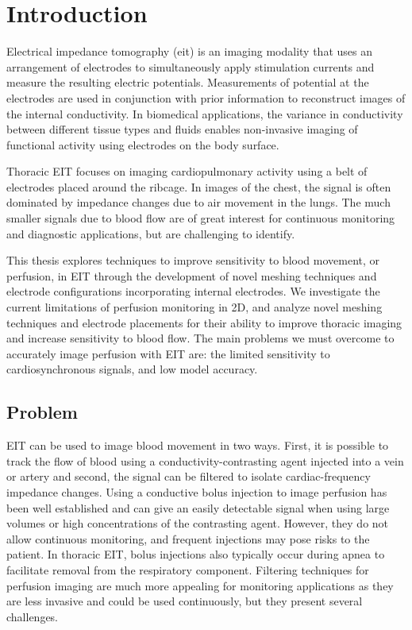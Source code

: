 \chapter{Introduction}

Electrical impedance tomography (\acrshort{eit}) is an imaging modality that uses an arrangement 
of electrodes to simultaneously apply 
stimulation currents and measure 
the resulting electric potentials. Measurements of potential at the 
electrodes are used in conjunction with 
prior information to reconstruct images 
of the internal conductivity. In biomedical applications, 
the variance in conductivity between different 
tissue types and fluids enables non-invasive 
imaging of functional activity using electrodes on the 
body surface. 

Thoracic EIT focuses on imaging cardiopulmonary activity
using a belt of electrodes placed around the ribcage.
In images of the chest, the signal is often dominated by 
impedance changes due to air movement in the lungs. 
The much smaller signals due to blood flow are of great interest for 
continuous monitoring and diagnostic applications,
but are challenging to identify. 

This thesis explores techniques to improve sensitivity to blood movement, or perfusion,  
in EIT through the development of novel meshing techniques and electrode configurations
incorporating internal electrodes. 
We investigate the current limitations of perfusion monitoring in 2D, and
analyze novel meshing techniques and electrode placements for their 
ability to improve thoracic imaging and increase sensitivity to blood flow. 
The main problems we must overcome to accurately 
image perfusion with EIT are: the limited sensitivity 
to cardiosynchronous signals, and low model accuracy.

\section{Problem}

EIT can be used to image blood movement in two ways. 
First, it is possible to track the flow of blood using a 
conductivity-contrasting agent injected into a vein or artery
and second, the signal can be filtered to isolate cardiac-frequency 
impedance changes. 
Using a conductive bolus injection to image perfusion has been well established and 
can give an easily detectable signal when using large volumes
or high concentrations of the contrasting agent. However, they do not 
allow continuous monitoring, and frequent injections may pose 
risks to the patient.
In thoracic EIT, bolus injections also typically occur during apnea to 
facilitate removal from the respiratory component.
Filtering techniques for perfusion imaging are much more appealing for 
monitoring applications as they are less invasive 
and could be used continuously, but they present several challenges. 

